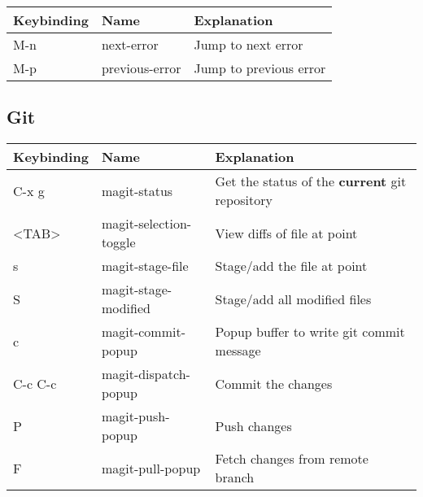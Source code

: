 \documentclass[11pt]{article}
\begin{document}
\begin{center}
\begin{tabular}{lll}
Keybinding & Name & Explanation\\
\hline
M-n & next-error & Jump to next error\\
M-p & previous-error & Jump to previous error\\
\end{tabular}
\end{center}


\newpage

\subsection{Git}
\label{sec:orgheadline4}

\begin{center}
\begin{tabular}{lll}
Keybinding & Name & Explanation\\
\hline
C-x g & magit-status & Get the status of the \textbf{current} git repository\\
<TAB> & magit-selection-toggle & View diffs of file at point\\
s & magit-stage-file & Stage/add the file at point\\
S & magit-stage-modified & Stage/add all modified files\\
c & magit-commit-popup & Popup buffer to write git commit message\\
C-c C-c & magit-dispatch-popup & Commit the changes\\
P & magit-push-popup & Push changes\\
F & magit-pull-popup & Fetch changes from remote branch\\
\end{tabular}
\end{center}
\end{document}
